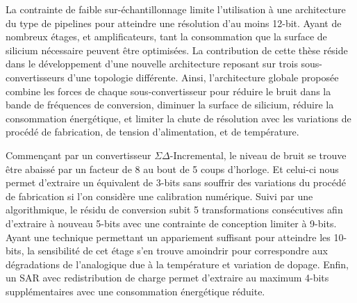 \begin{mdframed}[linecolor=Prune,linewidth=1]
La contrainte de faible sur-échantillonnage limite l'utilisation à une architecture du type de pipelines pour atteindre une résolution d'au moins 12-bit. Ayant de nombreux étages, et amplificateurs, tant la consommation que la surface de silicium nécessaire peuvent être optimisées. La contribution de cette thèse réside dans le développement d'une nouvelle architecture reposant sur trois sous-convertisseurs d'une topologie différente. Ainsi, l'architecture globale proposée combine les forces de chaque sous-convertisseur pour réduire le bruit dans la bande de fréquences de conversion, diminuer la surface de silicium, réduire la consommation énergétique, et limiter la chute de résolution avec les variations de procédé de fabrication, de tension d'alimentation, et de température.

Commençant par un convertisseur $\Sigma\Delta$-Incremental, le niveau de bruit se trouve être abaissé par un facteur de 8 au bout de 5 coups d'horloge. Et celui-ci nous permet d'extraire un équivalent de 3-bits sans souffrir des variations du procédé de fabrication si l'on considère une calibration numérique. Suivi par une algorithmique, le résidu de conversion subit 5 transformations consécutives afin d'extraire à nouveau 5-bits avec une contrainte de conception limiter à 9-bits. Ayant une technique permettant un appariement suffisant pour atteindre les 10-bits, la sensibilité de cet étage s'en trouve amoindrir pour correspondre aux dégradations de l'analogique due à la température et variation de dopage. Enfin, un SAR avec redistribution de charge permet d'extraire au maximum 4-bits supplémentaires avec une consommation énergétique réduite.


\end{mdframed}
